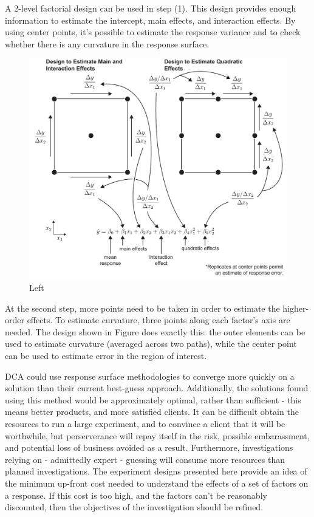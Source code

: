 \documentclass[11pt,a4paper,article]{memoir} %
\begin{document}
A 2-level factorial design can be used in step (1). This design provides enough information to estimate the intercept, main effects, and interaction effects. By using center points, it's possible to estimate the response variance and to check whether there is any curvature in the response surface. 

\begin{figure}
\includegraphics[width=\textwidth]{RSM_design.pdf}
\caption{Left}
\end{figure}

At the second step, more points need to be taken in order to estimate the higher-order effects. To estimate curvature, three points along each factor's axis are needed. The design shown in Figure does exactly this: the outer elements can be used to estimate curvature (averaged across two paths), while the center point can be used to estimate error in the region of interest.

 DCA could use response surface methodologies to converge more quickly on a solution than their current best-guess approach. Additionally, the solutions found using this method would be approximately optimal, rather than sufficient - this means better products, and more satisfied clients. It can be difficult obtain the resources to run a large experiment, and to convince a client that it will be worthwhile, but perserverance will repay itself in the risk, possible embarassment, and potential loss of business avoided as a result. Furthermore, investigations relying on - admittedly expert - guessing will consume more resources than planned investigations. The experiment designs presented here provide an idea of the minimum up-front cost needed to understand the effects of a set of factors on a response. If this cost is too high, and the factors can't be reasonably discounted, then the objectives of the investigation should be refined.
\end{document}

